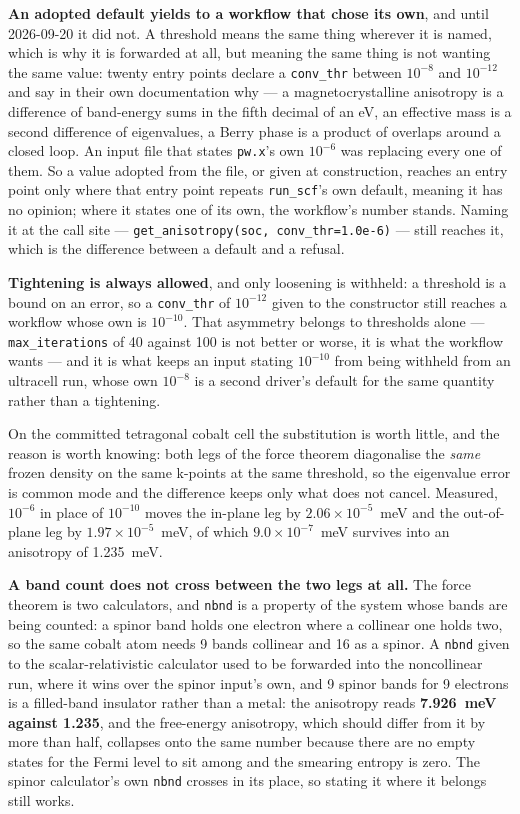 \documentclass[11pt,a4paper]{article}
\newcommand{\code}[1]{\texttt{\small #1}}
\begin{document}
\textbf{An adopted default yields to a workflow that chose its own}, and until
2026-09-20 it did not. A threshold means the same thing wherever it is named,
which is why it is forwarded at all, but meaning the same thing is not wanting
the same value: twenty entry points declare a \code{conv\_thr} between
$10^{-8}$ and $10^{-12}$ and say in their own documentation why --- a
magnetocrystalline anisotropy is a difference of band-energy sums in the fifth
decimal of an eV, an effective mass is a second difference of eigenvalues, a
Berry phase is a product of overlaps around a closed loop. An input file that
states \code{pw.x}'s own $10^{-6}$ was replacing every one of them. So a value
adopted from the file, or given at construction, reaches an entry point only
where that entry point repeats \code{run\_scf}'s own default, meaning it has no
opinion; where it states one of its own, the workflow's number stands. Naming
it at the call site --- \code{get\_anisotropy(soc, conv\_thr=1.0e-6)} ---
still reaches it, which is the difference between a default and a refusal.

\textbf{Tightening is always allowed}, and only loosening is withheld: a
threshold is a bound on an error, so a \code{conv\_thr} of $10^{-12}$ given to
the constructor still reaches a workflow whose own is $10^{-10}$. That
asymmetry belongs to thresholds alone --- \code{max\_iterations} of 40 against
100 is not better or worse, it is what the workflow wants --- and it is what
keeps an input stating $10^{-10}$ from being withheld from an ultracell run,
whose own $10^{-8}$ is a second driver's default for the same quantity rather
than a tightening.

On the committed tetragonal cobalt cell the substitution is worth little,
and the reason is worth knowing: both legs of the force theorem diagonalise the
\emph{same} frozen density on the same k-points at the same threshold, so the
eigenvalue error is common mode and the difference keeps only what does not
cancel. Measured, $10^{-6}$ in place of $10^{-10}$ moves the in-plane leg by
$2.06 \times 10^{-5}$~meV and the out-of-plane leg by $1.97 \times
10^{-5}$~meV, of which $9.0 \times 10^{-7}$~meV survives into an anisotropy of
1.235~meV.

\textbf{A band count does not cross between the two legs at all.} The force
theorem is two calculators, and \code{nbnd} is a property of the system whose
bands are being counted: a spinor band holds one electron where a collinear one
holds two, so the same cobalt atom needs 9 bands collinear and 16 as a spinor.
A \code{nbnd} given to the scalar-relativistic calculator used to be forwarded
into the noncollinear run, where it wins over the spinor input's own, and 9
spinor bands for 9 electrons is a filled-band insulator rather than a metal:
the anisotropy reads \textbf{7.926~meV against 1.235}, and the free-energy
anisotropy, which should differ from it by more than half, collapses onto the
same number because there are no empty states for the Fermi level to sit among
and the smearing entropy is zero. The spinor calculator's own \code{nbnd}
crosses in its place, so stating it where it belongs still works.
\end{document}
